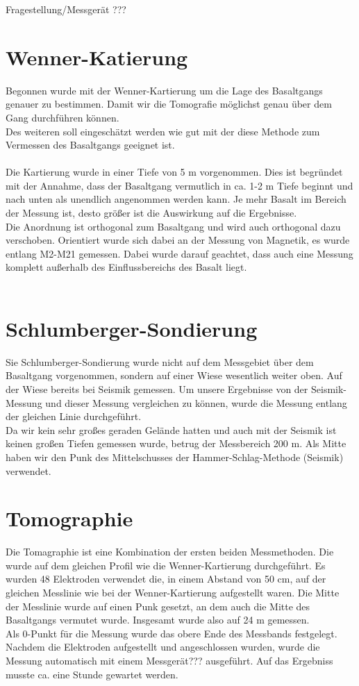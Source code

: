 
Fragestellung/Messgerät ???

\section{Wenner-Katierung}
Begonnen wurde mit der Wenner-Kartierung um die Lage des Basaltgangs genauer zu bestimmen. Damit wir die Tomografie möglichst genau über dem Gang durchführen
können. \\
Des weiteren soll eingeschätzt werden wie gut mit der diese Methode zum Vermessen des Basaltgangs geeignet ist.\\
\\
Die Kartierung wurde in einer Tiefe von 5 m vorgenommen. Dies ist begründet mit der Annahme, dass der Basaltgang vermutlich in ca. 1-2 m Tiefe beginnt und nach unten 
als unendlich angenommen werden kann. Je mehr Basalt im Bereich der Messung ist, desto größer ist die Auswirkung auf die Ergebnisse.\\
Die Anordnung ist orthogonal zum Basaltgang und wird auch orthogonal dazu verschoben. Orientiert wurde sich dabei an der Messung von Magnetik, es wurde 
entlang M2-M21 gemessen. Dabei wurde darauf geachtet, dass auch eine Messung komplett außerhalb 
des Einflussbereichs des Basalt liegt.\\
\\

 
\section{Schlumberger-Sondierung}
Sie Schlumberger-Sondierung wurde nicht auf dem Messgebiet über dem Basaltgang vorgenommen, sondern auf einer Wiese wesentlich weiter oben. Auf der Wiese 
bereits bei Seismik gemessen. Um unsere Ergebnisse von der Seismik-Messung und dieser Messung vergleichen zu können, wurde die Messung entlang der gleichen
Linie durchgeführt. \\
Da wir kein sehr großes geraden Gelände hatten und auch mit der Seismik ist keinen großen Tiefen gemessen wurde, betrug der Messbereich 200 m. Als Mitte 
haben wir den Punk des Mittelschusses der Hammer-Schlag-Methode (Seismik) verwendet.

\section{Tomographie}
Die Tomagraphie ist eine Kombination der ersten beiden Messmethoden. Die wurde auf dem gleichen Profil wie die Wenner-Kartierung durchgeführt.
Es wurden 48 Elektroden verwendet die, in einem Abstand von 50 cm, auf der gleichen Messlinie wie bei der Wenner-Kartierung aufgestellt waren. 
Die Mitte der Messlinie wurde auf einen Punk gesetzt, an dem auch die Mitte des Basaltgangs vermutet wurde. Insgesamt wurde also auf 24 m gemessen.\\
Als 0-Punkt für die Messung wurde das obere Ende des Messbands festgelegt.
Nachdem die Elektroden aufgestellt und angeschlossen wurden, wurde die Messung automatisch mit einem Messgerät??? ausgeführt. Auf das Ergebniss musste ca. 
eine Stunde gewartet werden.